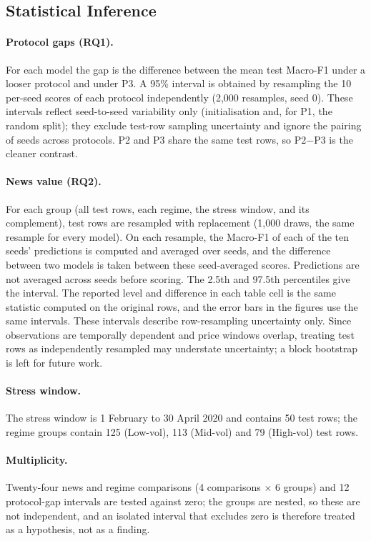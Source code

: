 \subsection{Statistical Inference}
\paragraph{Protocol gaps (RQ1).} For each model the gap is the difference between the mean test Macro-F1 under a looser protocol and under P3. A 95\% interval is obtained by resampling the 10 per-seed scores of each protocol independently (2{,}000 resamples, seed 0). These intervals reflect seed-to-seed variability only (initialisation and, for P1, the random split); they exclude test-row sampling uncertainty and ignore the pairing of seeds across protocols. P2 and P3 share the same test rows, so P2$-$P3 is the cleaner contrast.
\paragraph{News value (RQ2).} For each group (all test rows, each regime, the stress window, and its complement), test rows are resampled with replacement (1{,}000 draws, the same resample for every model). On each resample, the Macro-F1 of each of the ten seeds' predictions is computed and averaged over seeds, and the difference between two models is taken between these seed-averaged scores. Predictions are not averaged across seeds before scoring. The 2.5th and 97.5th percentiles give the interval. The reported level and difference in each table cell is the same statistic computed on the original rows, and the error bars in the figures use the same intervals. These intervals describe row-resampling uncertainty only. Since observations are temporally dependent and price windows overlap, treating test rows as independently resampled may understate uncertainty; a block bootstrap is left for future work.
\paragraph{Stress window.} The stress window is 1 February to 30 April 2020 and contains 50 test rows; the regime groups contain 125 (Low-vol), 113 (Mid-vol) and 79 (High-vol) test rows.
\paragraph{Multiplicity.} Twenty-four news and regime comparisons (4 comparisons $\times$ 6 groups) and 12 protocol-gap intervals are tested against zero; the groups are nested, so these are not independent, and an isolated interval that excludes zero is therefore treated as a hypothesis, not as a finding.


